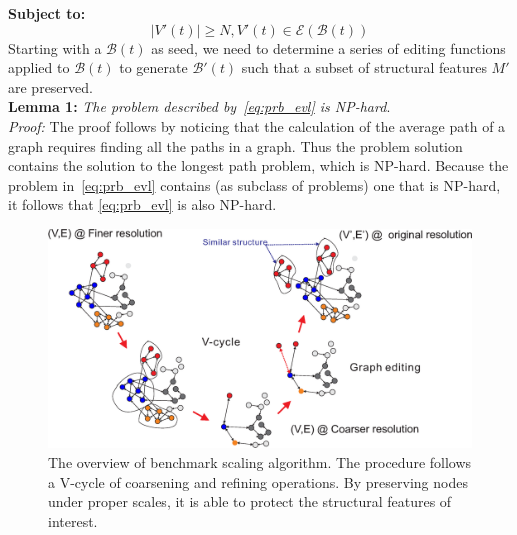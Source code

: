 \textbf{Subject to:} 
\begin{equation}\label{eq:prb_SUB}
|V'(t)|\geq N, V'(t) \in \mathcal E(\mathcal B(t))
\end{equation}
Starting with a $\mathcal B(t)$ as seed, we need to determine a series of editing functions applied to $\mathcal B(t)$ to generate $\mathcal B'(t)$ such that a subset of structural features $M'$ are preserved. \\
\noindent \textbf{Lemma 1:}\label{def:causal}
\textit{The problem described by~\eqref{eq:prb_evl} is NP-hard}.\\
\textit{Proof:} The proof follows by noticing that the calculation of the average path of a graph requires finding all the paths in a graph. Thus the problem solution contains the solution to  the longest path problem, which is NP-hard. Because the problem in~\eqref{eq:prb_evl} contains (as subclass of problems) one that is NP-hard, it follows that \eqref{eq:prb_evl} is also NP-hard.\\
\begin{figure}%
  \centering
  \includegraphics[width=1\columnwidth]{V.eps}
  \caption{The overview of benchmark scaling algorithm. The procedure follows a V-cycle of coarsening and refining operations. By preserving nodes under proper scales, it is able to protect the  structural features of interest.}
  \label{fig:V}
  \vskip -5mm
\end{figure}
